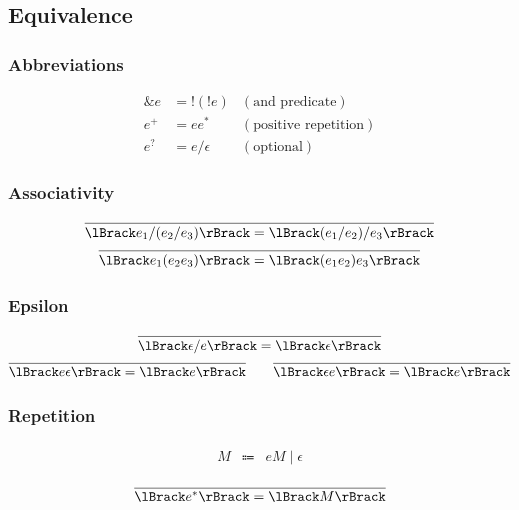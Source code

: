 \subsection{Equivalence}

\subsubsection{Abbreviations}

\begin{align*}
  \mathop{\&} e &= \mathop{!} (\mathop{!} e) &(\text{and predicate}) \\
  e^+ &= e e^* &(\text{positive repetition}) \\
  e^? &= e / \epsilon &(\text{optional})
\end{align*}

\subsubsection{Associativity}

\begin{gather*}
  \infer{\semanticf{e_1 / (e_2 / e_3)} = \semanticf{(e_1 / e_2) / e_3}}{}
  \\
  \infer{\semanticf{e_1 (e_2 e_3)} = \semanticf{(e_1 e_2) e_3}}{}
\end{gather*}

\subsubsection{Epsilon}

\begin{gather*}
  \infer{\semanticf{\epsilon / e} = \semanticf{\epsilon}}{}
  \\
  \infer{\semanticf{e \epsilon} = \semanticf{e}}{}
  \hspace{2em}
  \infer{\semanticf{\epsilon e} = \semanticf{e}}{}
\end{gather*}

\subsubsection{Repetition}

\begin{align*}
  \begin{array}{rcl}
  M & \Coloneq & e M \mid \epsilon
  \end{array}
\end{align*}

\begin{gather*}
  \infer{\semanticf{e^*} = \semanticf{M}}{}
\end{gather*}


